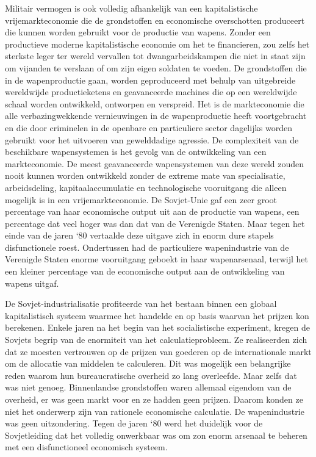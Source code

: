 Militair vermogen is ook volledig afhankelijk van een kapitalistische vrijemarkteconomie die de grondstoffen en economische overschotten produceert die kunnen worden gebruikt voor de productie van wapens. Zonder een productieve moderne kapitalistische economie om het te financieren, zou zelfs het sterkste leger ter wereld vervallen tot dwangarbeidskampen die niet in staat zijn om vijanden te verslaan of om zijn eigen soldaten te voeden. De grondstoffen die in de wapenproductie gaan, worden geproduceerd met behulp van uitgebreide wereldwijde productieketens en geavanceerde machines die op een wereldwijde schaal worden ontwikkeld, ontworpen en verspreid. Het is de markteconomie die alle verbazingwekkende vernieuwingen in de wapenproductie heeft voortgebracht en die door criminelen in de openbare en particuliere sector dagelijks worden gebruikt voor het uitvoeren van gewelddadige agressie. De complexiteit van de beschikbare wapensystemen is het gevolg van de ontwikkeling van een markteconomie. De meest geavanceerde wapensystemen van deze wereld zouden nooit kunnen worden ontwikkeld zonder de extreme mate van specialisatie, arbeidsdeling, kapitaalaccumulatie en technologische vooruitgang die alleen mogelijk is in een vrijemarkteconomie. De Sovjet-Unie gaf een zeer groot percentage van haar economische output uit aan de productie van wapens, een percentage dat veel hoger was dan dat van de Verenigde Staten. Maar tegen het einde van de jaren `80 vertaalde deze uitgave zich in enorm dure stapels disfunctionele roest. Ondertussen had de particuliere wapenindustrie van de Verenigde Staten enorme vooruitgang geboekt in haar wapenarsenaal, terwijl het een kleiner percentage van de economische output aan de ontwikkeling van wapens uitgaf.

De Sovjet-industrialisatie profiteerde van het bestaan binnen een globaal kapitalistisch systeem waarmee het handelde en op basis waarvan het prijzen kon berekenen. Enkele jaren na het begin van het socialistische experiment, kregen de Sovjets begrip van de enormiteit van het calculatieprobleem. Ze realiseerden zich dat ze moesten vertrouwen op de prijzen van goederen op de internationale markt om de allocatie van middelen te calculeren. Dit was mogelijk een belangrijke reden waarom hun bureaucratische overheid zo lang overleefde. Maar zelfs dat was niet genoeg. Binnenlandse grondstoffen waren allemaal eigendom van de overheid, er was geen markt voor en ze hadden geen prijzen. Daarom konden ze niet het onderwerp zijn van rationele economische calculatie. De wapenindustrie was geen uitzondering. Tegen de jaren `80 werd het duidelijk voor de Sovjetleiding dat het volledig onwerkbaar was om zo\textquotesingle n enorm arsenaal te beheren met een disfunctioneel economisch systeem.

